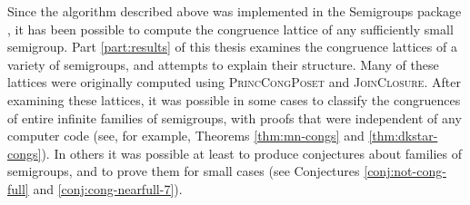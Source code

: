 Since the algorithm described above was implemented in the Semigroups package
\cite{semigroups}, it has been possible to compute the congruence lattice of any
sufficiently small semigroup.  Part \ref{part:results} of this thesis examines
the congruence lattices of a variety of semigroups, and attempts to explain
their structure.  Many of these lattices were originally computed using
\textsc{PrincCongPoset} and \textsc{JoinClosure}.  After examining these
lattices, it was possible in some cases to classify the congruences of entire
infinite families of semigroups, with proofs that were independent of any
computer code (see, for example, Theorems \ref{thm:mn-congs} and
\ref{thm:dkstar-congs}).  In others it was possible at least to produce
conjectures about families of semigroups, and to prove them for small cases (see
Conjectures \ref{conj:not-cong-full} and \ref{conj:cong-nearfull-7}).
